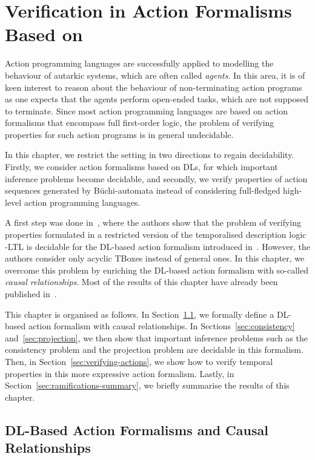 \chapter{Verification in Action Formalisms Based on \texorpdfstring{\ALCQIO}{ALCQIO}}\label{ch:ramifications}

Action programming languages are successfully applied to modelling the behaviour
of autarkic systems, which are often called \emph{agents}.  In this area, it is
of keen interest to reason about the behaviour of non-terminating action
programs as one expects that the agents perform open-ended tasks, which are not
supposed to terminate.  Since most action programming languages are based on
action formalisms that encompass full first-order logic, the problem of
verifying properties for such action programs is in general undecidable.

In this chapter, we restrict the setting in two directions to regain
decidability.  Firstly, we consider action formalisms based on DLs, for which
important inference problems become decidable, and secondly, we verify
properties of action sequences generated by Büchi-automata instead of
considering full-fledged high-level action programming languages.

A first step was done in~\cite{BaLM-ECAI10}, where the authors show that the
problem of verifying properties formulated in a restricted version of the
temporalised description logic \ALCO-LTL is decidable for the DL-based action
formalism introduced in~\cite{BLM+-AAAI05}.  However, the authors consider only
acyclic TBoxes instead of general ones.  In this chapter, we overcome this
problem by enriching the DL-based action formalism with so-called \emph{causal
relationships}.  Most of the results of this chapter have already been published
in~\cite{BaLL-LPAR10,BaLL-LTCS-10-01,YLL+-DL12}.

This chapter is organised as follows.  In Section~\ref{sec:action-formalism}, we
formally define a DL-based action formalism with causal relationships.  In
Sections~\ref{sec:consistency} and~\ref{sec:projection}, we then show that
important inference problems such as the consistency problem and the projection
problem are decidable in this formalism.  Then, in
Section~\ref{sec:verifying-actions}, we show how to verify temporal properties
in this more expressive action formalism.  Lastly, in
Section~\ref{sec:ramifications-summary}, we briefly summarise the results of
this chapter.


\section{DL-Based Action Formalisms and Causal Relationships}\label{sec:action-formalism}

